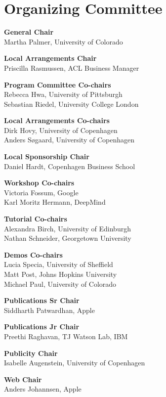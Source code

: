 \markboth{}{} %
\markright{}{} %

\section{Organizing Committee}

\setlength{\parindent}{0pt}

{\bf General Chair} \\
Martha Palmer, University of Colorado

{\bf Local Arrangements Chair} \\
Priscilla Rasmussen, ACL Business Manager

{\bf Program Committee Co-chairs} \\
Rebecca Hwa, University of Pittsburgh \\
Sebastian Riedel, University College London

{\bf Local Arrangements Co-chairs} \\
Dirk Hovy, University of Copenhagen \\
Anders S{\o}gaard, University of Copenhagen

{\bf Local Sponsorship Chair} \\
Daniel Hardt, Copenhagen Business School

{\bf Workshop Co-chairs} \\
Victoria Fossum, Google\\
Karl Moritz Hermann, DeepMind

{\bf Tutorial Co-chairs} \\
Alexandra Birch, University of Edinburgh \\
Nathan Schneider, Georgetown University

{\bf Demos Co-chairs} \\
Lucia Specia, University of Sheffield \\
Matt Post, Johns Hopkins University \\
Michael Paul, University of Colorado

{\bf Publications Sr Chair} \\
Siddharth Patwardhan, Apple

{\bf Publications Jr Chair} \\
Preethi Raghavan, TJ Watson Lab, IBM

{\bf Publicity Chair}\\
Isabelle Augenstein, University of Copenhagen

{\bf Web Chair}\\
Anders Johannsen, Apple

